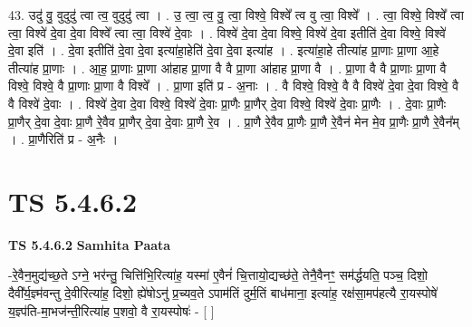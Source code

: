 \documentclass[17pt]{extarticle}
\begin{document}
43. उदु॑ वु॒ वुदुदु॑ त्वा त्व॒ वुदुदु॑ त्वा । . उ॒ त्वा॒ त्व॒ वु॒ त्वा॒ विश्वे॒ विश्वे᳚ त्व वु त्वा॒ विश्वे᳚ । . त्वा॒ विश्वे॒ विश्वे᳚ त्वा त्वा॒ विश्वे॑ दे॒वा दे॒वा विश्वे᳚ त्वा त्वा॒ विश्वे॑ दे॒वाः । . विश्वे॑ दे॒वा दे॒वा विश्वे॒ विश्वे॑ दे॒वा इतीति॑ दे॒वा विश्वे॒ विश्वे॑ दे॒वा इति॑ । . दे॒वा इतीति॑ दे॒वा दे॒वा इत्या॑हा॒हेति॑ दे॒वा दे॒वा इत्या॑ह । . इत्या॑हा॒हे तीत्या॑ह प्रा॒णाः प्रा॒णा आ॒हे तीत्या॑ह प्रा॒णाः । . आ॒ह॒ प्रा॒णाः प्रा॒णा आ॑हाह प्रा॒णा वै वै प्रा॒णा आ॑हाह प्रा॒णा वै । . प्रा॒णा वै वै प्रा॒णाः प्रा॒णा वै विश्वे॒ विश्वे॒ वै प्रा॒णाः प्रा॒णा वै विश्वे᳚ । . प्रा॒णा इति॑ प्र - अ॒नाः । . वै विश्वे॒ विश्वे॒ वै वै विश्वे॑ दे॒वा दे॒वा विश्वे॒ वै वै विश्वे॑ दे॒वाः । . विश्वे॑ दे॒वा दे॒वा विश्वे॒ विश्वे॑ दे॒वाः प्रा॒णैः प्रा॒णैर् दे॒वा विश्वे॒ विश्वे॑ दे॒वाः प्रा॒णैः । . दे॒वाः प्रा॒णैः प्रा॒णैर् दे॒वा दे॒वाः प्रा॒णै रे॒वैव प्रा॒णैर् दे॒वा दे॒वाः प्रा॒णै रे॒व । . प्रा॒णै रे॒वैव प्रा॒णैः प्रा॒णै रे॒वैन॑ मेन मे॒व प्रा॒णैः प्रा॒णै रे॒वैन᳚म् । . प्रा॒णैरिति॑ प्र - अ॒नैः । \newline
\pagebreak
{}

\section{ TS 5.4.6.2 }

\textbf{TS 5.4.6.2 } \newline
\textbf{Samhita Paata} \newline

-रे॒वैन॒मुद्य॑च्छ॒ते ऽग्ने॒ भर॑न्तु॒ चित्ति॑भि॒रित्या॑ह॒ यस्मा॑ ए॒वैनं॑ चि॒त्तायो॒द्यच्छ॑ते॒ तेनै॒वैनꣳ॒॒ सम॑र्द्धयति॒ पञ्च॒ दिशो॒ दैवी᳚र्य॒ज्ञ्म॑वन्तु दे॒वीरित्या॑ह॒ दिशो॒ ह्ये॑षोऽनु॑ प्र॒च्यव॒ते ऽपाम॑तिं दुर्म॒तिं बाध॑माना॒ इत्या॑ह॒ रक्ष॑सा॒मप॑हत्यै रा॒यस्पोषे॑ य॒ज्ञ्प॑ति-मा॒भज॑न्ती॒रित्या॑ह प॒शवो॒ वै रा॒यस्पोषः॑ - [  ] \newline
\end{document}
